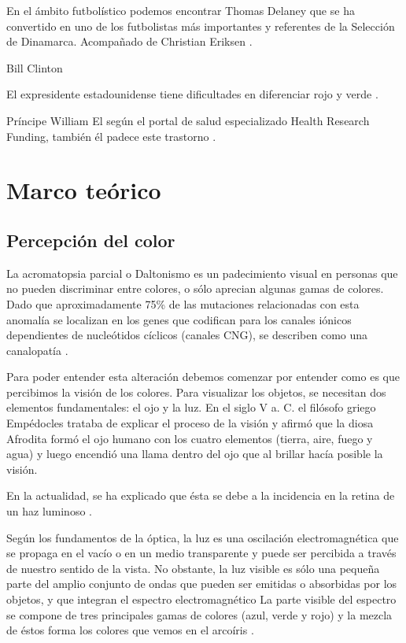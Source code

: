 \documentclass[10pt]{article}
\begin{document}
En el ámbito futbolístico podemos encontrar 
Thomas Delaney que se ha convertido en uno de los futbolistas más importantes y referentes de la Selección de Dinamarca. Acompañado de Christian Eriksen \cite{IEEEreferencias:Ref10}.
\setlength{\parskip}{2mm}

\newpage
Bill Clinton

El expresidente estadounidense tiene dificultades en diferenciar rojo y verde \cite{IEEEreferencias:Ref11}.

\setlength{\parskip}{2mm}

Príncipe William
El según el portal de salud especializado Health Research Funding, también él padece este trastorno \cite{IEEEreferencias:Ref11}.

\section{Marco teórico }
\subsection{Percepción del color} 

La acromatopsia parcial o Daltonismo es un padecimiento visual en personas que no pueden discriminar entre colores, o sólo aprecian algunas gamas de colores. Dado que aproximadamente 75\% de las mutaciones relacionadas con esta anomalía se localizan en los genes que codifican para los canales iónicos dependientes de nucleótidos cíclicos (canales CNG), se describen como una canalopatía \cite{IEEEreferencias:Ref12}.

\setlength{\parskip}{2mm}

Para poder entender esta alteración debemos comenzar por entender como es que percibimos la visión de los colores.
Para visualizar los objetos, se necesitan dos elementos fundamentales: el ojo y la luz. En el siglo V a. C. el filósofo griego Empédocles trataba de explicar el proceso de la visión y afirmó que la diosa Afrodita formó el ojo humano con los cuatro elementos (tierra, aire, fuego y agua) y luego encendió una llama dentro del ojo que al brillar hacía posible la visión\cite{IEEEreferencias:Ref13}.

\setlength{\parskip}{2mm}

En la actualidad, se ha explicado que ésta se debe a la incidencia en la retina de un haz luminoso \cite{IEEEreferencias:Ref13}.

\setlength{\parskip}{2mm}

Según los fundamentos de la óptica, la luz es una oscilación electromagnética que se propaga en el vacío o en un medio transparente y puede ser percibida a través de nuestro sentido de la vista. No obstante, la luz visible es sólo una pequeña parte del amplio conjunto de ondas que pueden ser emitidas o absorbidas por los objetos, y que integran el espectro electromagnético La parte visible del espectro se compone de tres principales gamas de colores (azul, verde y rojo) y la mezcla de éstos forma los colores que vemos en el arcoíris \cite{IEEEreferencias:Ref12}.
\end{document}
